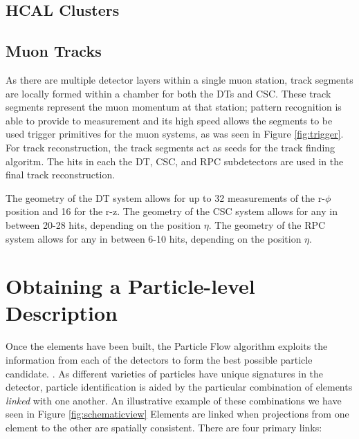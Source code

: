\subsection{HCAL Clusters}

\subsection{Muon Tracks}

As there are multiple detector layers within a single muon station, track segments are locally formed within a chamber for both the DTs and CSC. These track segments represent the muon momentum at that station; pattern recognition is able to provide to measurement and its high speed allows the segments to be used trigger primitives for the muon systems, as was seen in Figure \ref{fig:trigger}. For track reconstruction, the track segments act as seeds for the track finding algoritm. The hits in each the DT, CSC, and RPC subdetectors are used in the final track reconstruction.

The geometry of the DT system allows for up to 32 measurements of the r-$\phi$ position and 16 for the r-z. The geometry of the CSC system allows for any in between 20-28 hits, depending on the position $\eta$. The geometry of the RPC system allows for any in between 6-10 hits, depending on the position $\eta$. 

\section{Obtaining a Particle-level Description}

Once the elements have been built, the Particle Flow algorithm exploits the information from each of the detectors to form the best possible particle candidate. \cite{CMS-PRF-14-001}. As different varieties of particles have unique signatures in the detector, particle identification is aided by the particular combination of elements \textit{linked} with one another. An illustrative example of these combinations we have seen in Figure \ref{fig:schematicview}  Elements are linked when projections from one element to the other are spatially consistent. There are four primary links:

